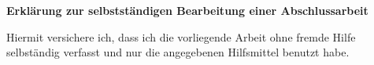 \clearpage
\thispagestyle{plain}
\textbf{\sffamily\large Erklärung zur selbstständigen Bearbeitung einer Abschlussarbeit}

Hiermit versichere ich, dass ich die vorliegende
Arbeit  ohne fremde Hilfe selbständig verfasst und nur die
angegebenen Hilfsmittel benutzt habe.

\vspace{1cm}
\noindent\makebox[3cm]{\hrulefill} \hspace{0.1cm}
    \makebox[3cm]{\hrulefill} \hspace{0.1cm}
    \makebox[6cm]{\hrulefill} \\
\noindent{} \hspace{0.1cm}
     \hspace{0.1cm}

\clearpage
